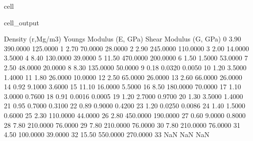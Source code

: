 \documentclass[letterpaper,10pt,english]{jupyterBook}
\begin{document}
{{\begin{sphinxuseclass}{cell}
\begin{sphinxVerbatimOutput}
\begin{sphinxuseclass}{cell_output}
\begin{sphinxVerbatim}[commandchars=\\\{\}]
    Density (r,Mg/m3)  Young\PYGZsq{}s Modulus (E, GPa)  Shear Modulus (G, GPa)  \PYGZbs{}
0                3.90                  390.0000                125.0000   
1                2.70                   70.0000                 28.0000   
2                2.90                  245.0000                110.0000   
3                2.00                   14.0000                  3.5000   
4                8.40                  130.0000                 39.0000   
5               11.50                  470.0000                200.0000   
6                1.50                    1.5000                 53.0000   
7                2.50                   48.0000                 20.0000   
8                8.30                  135.0000                 50.0000   
9                0.18                    0.0320                  0.0050   
10               1.20                    3.5000                  1.4000   
11               1.80                   26.0000                 10.0000   
12               2.50                   65.0000                 26.0000   
13               2.60                   66.0000                 26.0000   
14               0.92                    9.1000                  3.6000   
15              11.10                   16.0000                  5.5000   
16               8.50                  180.0000                 70.0000   
17               1.10                    3.0000                  0.7600   
18               0.91                    0.0016                  0.0005   
19               1.20                    2.7000                  0.9700   
20               1.30                    3.5000                  1.4000   
21               0.95                    0.7000                  0.3100   
22               0.89                    0.9000                  0.4200   
23               1.20                    0.0250                  0.0086   
24               1.40                    1.5000                  0.6000   
25               2.30                  110.0000                 44.0000   
26               2.80                  450.0000                190.0000   
27               0.60                    9.0000                  0.8000   
28               7.80                  210.0000                 76.0000   
29               7.80                  210.0000                 76.0000   
30               7.80                  210.0000                 76.0000   
31               4.50                  100.0000                 39.0000   
32              15.50                  550.0000                270.0000   
33                NaN                       NaN                     NaN   


\end{sphinxVerbatim}
\end{sphinxuseclass}
\end{sphinxVerbatimOutput}
\end{sphinxuseclass}}}
\end{document}
